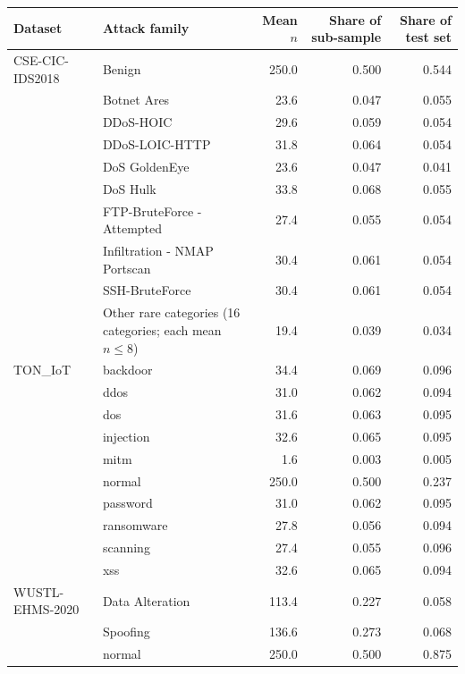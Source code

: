 \begin{tabular}{l l r r r}
\toprule
\textbf{Dataset} & \textbf{Attack family} & \textbf{Mean $n$} & \textbf{Share of sub-sample} & \textbf{Share of test set} \\
\midrule
CSE-CIC-IDS2018 & Benign & 250.0 & 0.500 & 0.544 \\
 & Botnet Ares & 23.6 & 0.047 & 0.055 \\
 & DDoS-HOIC & 29.6 & 0.059 & 0.054 \\
 & DDoS-LOIC-HTTP & 31.8 & 0.064 & 0.054 \\
 & DoS GoldenEye & 23.6 & 0.047 & 0.041 \\
 & DoS Hulk & 33.8 & 0.068 & 0.055 \\
 & FTP-BruteForce - Attempted & 27.4 & 0.055 & 0.054 \\
 & Infiltration - NMAP Portscan & 30.4 & 0.061 & 0.054 \\
 & SSH-BruteForce & 30.4 & 0.061 & 0.054 \\
 & Other rare categories (16 categories; each mean $n \leq 8$) & 19.4 & 0.039 & 0.034 \\
TON\_IoT & backdoor & 34.4 & 0.069 & 0.096 \\
 & ddos & 31.0 & 0.062 & 0.094 \\
 & dos & 31.6 & 0.063 & 0.095 \\
 & injection & 32.6 & 0.065 & 0.095 \\
 & mitm & 1.6 & 0.003 & 0.005 \\
 & normal & 250.0 & 0.500 & 0.237 \\
 & password & 31.0 & 0.062 & 0.095 \\
 & ransomware & 27.8 & 0.056 & 0.094 \\
 & scanning & 27.4 & 0.055 & 0.096 \\
 & xss & 32.6 & 0.065 & 0.094 \\
WUSTL-EHMS-2020 & Data Alteration & 113.4 & 0.227 & 0.058 \\
 & Spoofing & 136.6 & 0.273 & 0.068 \\
 & normal & 250.0 & 0.500 & 0.875 \\
\bottomrule
\end{tabular}